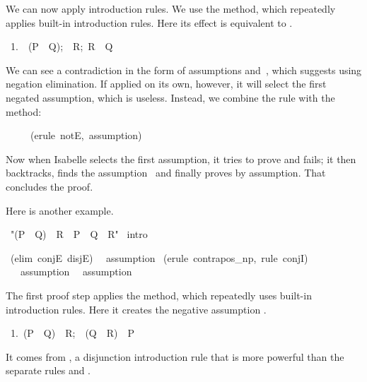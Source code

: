 We can now apply introduction rules.  We use the {} method, which
repeatedly  applies built-in introduction rules.  Here its effect is equivalent
to .\begin{isabelle}
\ 1.\ \isasymlbrakk{\isasymnot}\ (P\ \isasymlongrightarrow\ Q);\ \isasymnot\ R;\
R\isasymrbrakk\ \isasymLongrightarrow\ Q%
\end{isabelle}
We can see a contradiction in the form of assumptions 
and~\isa{R}, which suggests using negation elimination.  If applied on its own,
however, it will select the first negated assumption, which is useless.   Instead,
we combine the rule with  the
 method:
\begin{isabelle}
\ \ \ \ \ (erule\ notE,\ assumption)
\end{isabelle}
Now when Isabelle selects the first assumption, it tries to prove  and fails; it then backtracks, finds the 
assumption~\isa{\isasymnot\ R} and finally proves \isa{R} by assumption.  That
concludes the proof.

\medskip

Here is another example. 
\begin{isabelle}
\ "(P\ \isasymor\ Q)\ \isasymand\ R\
\isasymLongrightarrow\ P\ \isasymor\ Q\ \isasymand\ R"\isanewline
{}\ intro%


\ (elim\ conjE\ disjE)\isanewline
\ \ assumption
\isanewline
\isacommand{apply}\ (erule\ contrapos_np,\ rule\ conjI)\isanewline
\ \ \isacommand{apply}\ assumption\isanewline
\ \ assumption\isanewline
\isacommand{done}
\end{isabelle}
%
The first proof step applies the {\isa{intro}} method, which repeatedly 
uses built-in introduction rules.  Here it creates the negative assumption \isa{\isasymnot\ (Q\ \isasymand\
R)}.
\begin{isabelle}
\ 1.\ \isasymlbrakk(P\ \isasymor\ Q)\ \isasymand\ R;\ \isasymnot\ (Q\ \isasymand\
R)\isasymrbrakk\ \isasymLongrightarrow\ P%
\end{isabelle}
It comes from ,  a disjunction introduction rule that is more
powerful than the separate rules   and  .

